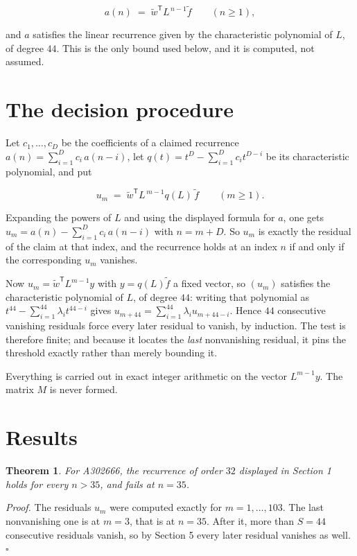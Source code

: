 \documentclass[11pt]{article}
\newtheorem{theorem}{Theorem}
\theoremstyle{definition}
\begin{document}
\[a(n) \;=\; \tilde w^{\mathsf T} L^{\,n-1} \tilde f \qquad (n \ge 1),\]

and $a$ satisfies the linear recurrence given by the characteristic polynomial of $L$, of degree $44$. This is the only bound used below, and it is computed, not assumed.

\section{The decision procedure}

Let $c_1,\dots,c_D$ be the coefficients of a claimed recurrence $a(n) = \sum_{i=1}^{D} c_i\,a(n-i)$, let $q(t) = t^{D} - \sum_{i=1}^{D} c_i t^{D-i}$ be its characteristic polynomial, and put

\[u_m \;=\; \tilde w^{\mathsf T} L^{\,m-1} q(L)\,\tilde f \qquad (m \ge 1).\]

Expanding the powers of $L$ and using the displayed formula for $a$, one gets $u_m = a(n) - \sum_{i=1}^{D} c_i\,a(n-i)$ with $n = m + D$. So $u_m$ is exactly the residual of the claim at that index, and the recurrence holds at an index $n$ if and only if the corresponding $u_m$ vanishes.

Now $u_m = \tilde w^{\mathsf T} L^{m-1} y$ with $y = q(L)\tilde f$ a fixed vector, so $(u_m)$ satisfies the characteristic polynomial of $L$, of degree $44$: writing that polynomial as $t^{44} - \sum_{i=1}^{44} \lambda_i t^{44-i}$ gives $u_{m+44} = \sum_{i=1}^{44} \lambda_i u_{m+44-i}$. Hence $44$ consecutive vanishing residuals force every later residual to vanish, by induction. The test is therefore finite; and because it locates the {\itshape last} nonvanishing residual, it pins the threshold exactly rather than merely bounding it.

Everything is carried out in exact integer arithmetic on the vector $L^{m-1}y$. The matrix $M$ is never formed.

\section{Results}

\begin{theorem} For A302666, the recurrence of order $32$ displayed in Section 1 holds for every $n > 35$, and fails at $n = 35$.\end{theorem}

{\itshape Proof.} The residuals $u_m$ were computed exactly for $m = 1,\dots,103$. The last nonvanishing one is at $m = 3$, that is at $n = 35$. After it, more than $S = 44$ consecutive residuals vanish, so by Section 5 every later residual vanishes as well. $\square$
\end{document}
